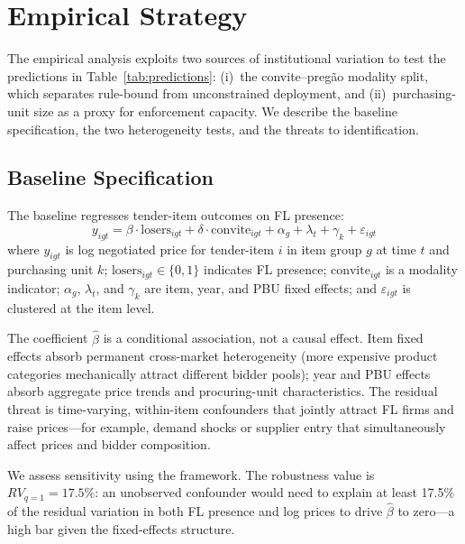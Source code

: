 \section{Empirical Strategy}
\label{sec:empirical}

The empirical analysis exploits two sources of institutional
variation to test the predictions in
Table~\ref{tab:predictions}: (i)~the convite--preg\~ao modality
split, which separates rule-bound from unconstrained deployment,
and (ii)~purchasing-unit size as a proxy for enforcement capacity.
We describe the baseline specification, the two heterogeneity
tests, and the threats to identification.

\subsection{Baseline Specification}
\label{sec:baseline}

The baseline regresses tender-item outcomes on FL presence:
\begin{equation}
  y_{igt} = \beta \cdot \text{losers}_{igt}
  + \delta \cdot \text{convite}_{igt}
  + \alpha_g + \lambda_t + \gamma_k + \varepsilon_{igt}
  \label{eq:baseline}
\end{equation}
where $y_{igt}$ is log negotiated price for tender-item $i$ in item
group $g$ at time $t$ and purchasing unit $k$;
$\text{losers}_{igt} \in \{0,1\}$ indicates FL presence;
$\text{convite}_{igt}$ is a modality indicator; $\alpha_g$,
$\lambda_t$, and $\gamma_k$ are item, year, and PBU fixed effects;
and $\varepsilon_{igt}$ is clustered at the item level.

The coefficient $\hat{\beta}$ is a conditional association, not a
causal effect. Item fixed effects absorb permanent cross-market
heterogeneity (more expensive product categories mechanically
attract different bidder pools); year and PBU effects absorb
aggregate price trends and procuring-unit characteristics. The
residual threat is time-varying, within-item confounders that
jointly attract FL firms and raise prices---for example, demand
shocks or supplier entry that simultaneously affect prices and
bidder composition.

We assess sensitivity using the \citet{cinelli2020making} framework.
The robustness value is $RV_{q=1} = 17.5\%$: an unobserved
confounder would need to explain at least 17.5\% of the residual
variation in both FL presence and log prices to drive $\hat{\beta}$
to zero---a high bar given the fixed-effects structure.

